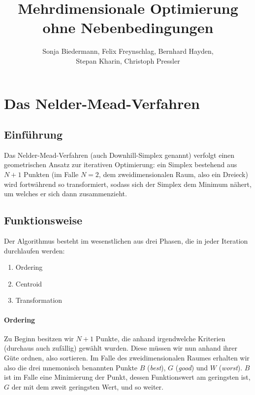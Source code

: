 \documentclass[naustrian]{article}
\begin{document}
\title{Mehrdimensionale Optimierung ohne Nebenbedingungen}

\author{Sonja Biedermann, Felix Freynschlag, Bernhard Hayden,\\
Stepan Kharin, Christoph Pressler}

\maketitle
\tableofcontents

\section{Das Nelder-Mead-Verfahren}

\subsection{Einführung}

Das Nelder-Mead-Verfahren (auch Downhill-Simplex genannt) verfolgt
einen geometrischen Ansatz zur iterativen Optimierung: ein Simplex
bestehend aus $N+1$ Punkten (im Falle $N=2$, dem zweidimensionalen
Raum, also ein Dreieck) wird fortwährend so transformiert, sodass
sich der Simplex dem Minimum nähert, um welches er sich dann zusammenzieht.\cite{nelder-mead-enwiki}

\subsection{Funktionsweise}

Der Algorithmus besteht im wesenstlichen aus drei
Phasen\cite{nelder-mead-scholarpedia}, die in jeder Iteration durchlaufen
werden:
\begin{enumerate}
    \item Ordering
    \item Centroid
    \item Transformation
\end{enumerate}

\paragraph{Ordering}

Zu Beginn besitzen wir $N+1$ Punkte, die anhand irgendwelche Kriterien
(durchaus auch zufällig) gewählt wurden. Diese müssen wir nun anhand
ihrer Güte ordnen, also sortieren. Im Falle des zweidimensionalen
Raumes erhalten wir also die drei mnemonisch benannten Punkte \textbf{$B$
}(\emph{best}), $G$ (\emph{good}) und $W$ (\emph{worst}).\cite{nelder-mead-unknown} $B$ ist
im Falle eine Minimierung der Punkt, dessen Funktionswert am geringsten
ist, $G$ der mit dem zweit geringsten Wert, und so weiter.
\end{document}
